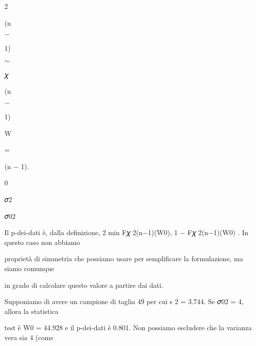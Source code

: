 \documentclass[a4paper,portrait,12pt]{article}
\begin{document}
2


\begin{flushleft}
(n
\end{flushleft}


$-$


1)


$\sim$


\begin{flushleft}
𝜒
\end{flushleft}


\begin{flushleft}
(n
\end{flushleft}


$-$


1)


\begin{flushleft}
W
\end{flushleft}


=


\begin{flushleft}
(n $-$ 1).
\end{flushleft}


0


\begin{flushleft}
𝜎2
\end{flushleft}


\begin{flushleft}
𝜎02
\end{flushleft}


\begin{flushleft}
Il p-dei-dati \`{e}, dalla definizione, 2 min F𝜒 2(n$-$1)(W0), 1 $-$ F𝜒 2(n$-$1)(W0) . In questo caso non abbiamo
\end{flushleft}


\begin{flushleft}
propriet\`{a} di simmetria che possiamo usare per semplificare la formulazione, ma siamo comunque
\end{flushleft}


\begin{flushleft}
in grado di calcolare questo valore a partire dai dati.
\end{flushleft}


\begin{flushleft}
Supponiamo di avere un campione di taglia 49 per cui s 2 = 3.744. Se 𝜎02 = 4, allora la statistica
\end{flushleft}


\begin{flushleft}
test \`{e} W0 = 44.928 e il p-dei-dati \`{e} 0.801. Non possiamo escludere che la varianza vera sia 4 (come
\end{flushleft}
\end{document}
